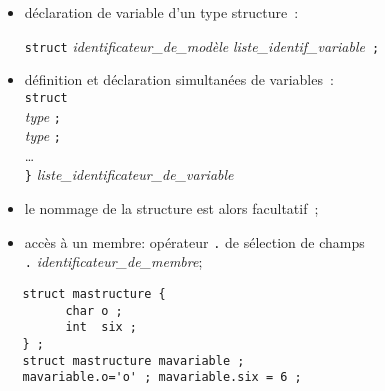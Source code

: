 \begin{frame}[fragile]
    \begin{itemize}
  \item d\'eclaration de variable d'un type structure~:\\
    \centerline{
      {\tt struct} {\it identificateur\_de\_mod\`ele}
      {\it liste\_identif\_variable}\ {\tt ;}
    }
  \item d\'efinition et d\'eclaration  simultan\'ees de variables~:\\
    \hspace*{10mm} {\tt struct}\hspace{3mm}{\it identificateur\_de\_mod\`ele}
    \hspace{3mm}{\tt \{}\\
    \hspace*{15mm} {\it type}\hspace{3mm}{\it liste\_identificateur\_de\_membre}
      \hspace{3mm}    {\tt ;}\\
    \hspace*{15mm} {\it type}\hspace{3mm}{\it liste\_identificateur\_de\_membre}
    \hspace{3mm} {\tt ;}\\
    \hspace*{15mm}\ldots\\
    \hspace*{10mm} {\tt \}}\hspace{3mm}
    {\it liste\_identificateur\_de\_variable}
    \hspace{3mm}{\tt ;}
  \item le nommage de la structure est alors facultatif~;
  \item acc\`es \`a un membre: op\'erateur {\tt .} de s\'election de champs\\
    {\tt .}
    {\it identificateur\_de\_membre};
  \end{itemize}
\begin{verbatim}
   struct mastructure {
         char o ;
         int  six ;
   } ;
   struct mastructure mavariable ; 
   mavariable.o='o' ; mavariable.six = 6 ;
\end{verbatim}
\end{frame}

